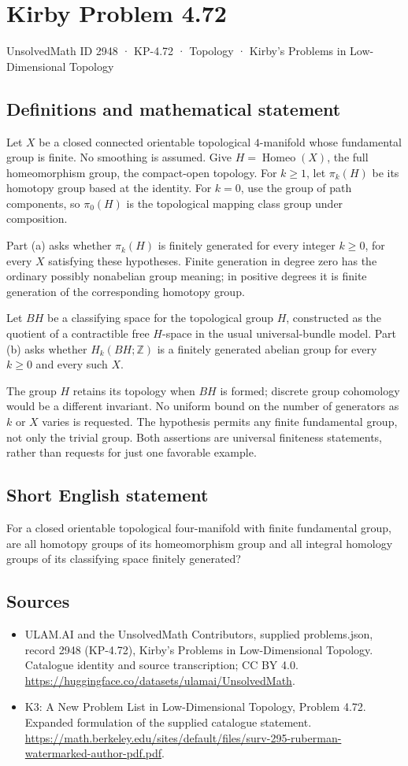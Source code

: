 \documentclass[11pt,a4paper]{article}
\begin{document}
\section*{Kirby Problem 4.72}\label{2948}
{\small UnsolvedMath ID 2948 · KP-4.72 · Topology · Kirby's Problems in Low-Dimensional Topology}
\subsection{Definitions and mathematical statement}
Let $X$ be a closed connected orientable topological $4$-manifold
whose fundamental group is finite. No smoothing is assumed.
Give $H=\operatorname{Homeo}(X)$, the full homeomorphism group,
the compact-open topology. For $k\ge1$, let $\pi_k(H)$ be its
homotopy group based at the identity. For $k=0$, use the group
of path components, so $\pi_0(H)$ is the topological mapping
class group under composition.

Part (a) asks whether $\pi_k(H)$ is finitely generated for every
integer $k\ge0$, for every $X$ satisfying these hypotheses.
Finite generation in degree zero has the ordinary possibly
nonabelian group meaning; in positive degrees it is finite generation
of the corresponding homotopy group.

Let $BH$ be a classifying space for the topological group $H$,
constructed as the quotient of a contractible free $H$-space in
the usual universal-bundle model. Part (b) asks whether
$H_k(BH;\mathbb Z)$ is a finitely generated abelian group for
every $k\ge0$ and every such $X$.

The group $H$ retains its topology when $BH$ is formed; discrete
group cohomology would be a different invariant. No uniform bound
on the number of generators as $k$ or $X$ varies is requested.
The hypothesis permits any finite fundamental group, not only
the trivial group. Both assertions are universal finiteness
statements, rather than requests for just one favorable example.
\subsection{Short English statement}
For a closed orientable topological four-manifold with finite fundamental group, are all homotopy groups of its homeomorphism group and all integral homology groups of its classifying space finitely generated?
\subsection{Sources}
\begin{itemize}
\item[S1] ULAM.AI and the UnsolvedMath Contributors, supplied problems.json, record 2948 (KP-4.72), Kirby's Problems in Low-Dimensional Topology. Catalogue identity and source transcription; CC BY 4.0.
\url{https://huggingface.co/datasets/ulamai/UnsolvedMath}.
\item[S2] K3: A New Problem List in Low-Dimensional Topology, Problem 4.72. Expanded formulation of the supplied catalogue statement.
\url{https://math.berkeley.edu/sites/default/files/surv-295-ruberman-watermarked-author-pdf.pdf}.
\end{itemize}
\end{document}
